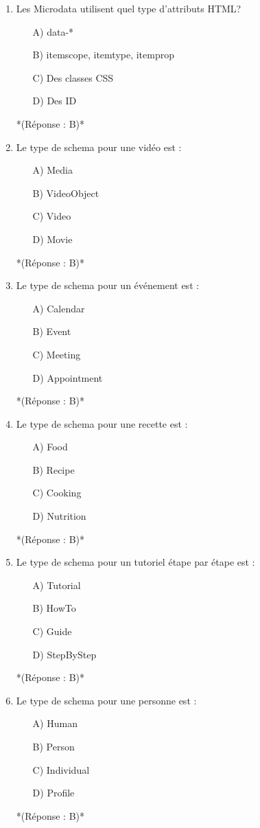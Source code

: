 \documentclass[12pt,a4paper,twoside]{report}
\begin{document}
\begin{enumerate}
\item Les Microdata utilisent quel type d'attributs HTML?
\begin{itemize}
\item[A)] data-*
\item[B)] itemscope, itemtype, itemprop
\item[C)] Des classes CSS
\item[D)] Des ID
\end{itemize}
*(Réponse : B)*

\item Le type de schema pour une vidéo est :
\begin{itemize}
\item[A)] Media
\item[B)] VideoObject
\item[C)] Video
\item[D)] Movie
\end{itemize}
*(Réponse : B)*

\item Le type de schema pour un événement est :
\begin{itemize}
\item[A)] Calendar
\item[B)] Event
\item[C)] Meeting
\item[D)] Appointment
\end{itemize}
*(Réponse : B)*

\item Le type de schema pour une recette est :
\begin{itemize}
\item[A)] Food
\item[B)] Recipe
\item[C)] Cooking
\item[D)] Nutrition
\end{itemize}
*(Réponse : B)*

\item Le type de schema pour un tutoriel étape par étape est :
\begin{itemize}
\item[A)] Tutorial
\item[B)] HowTo
\item[C)] Guide
\item[D)] StepByStep
\end{itemize}
*(Réponse : B)*

\item Le type de schema pour une personne est :
\begin{itemize}
\item[A)] Human
\item[B)] Person
\item[C)] Individual
\item[D)] Profile
\end{itemize}
*(Réponse : B)*


\end{enumerate}
\end{document}
